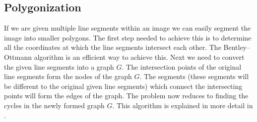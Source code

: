 \documentclass{article}
\begin{document}
\subsection{Polygonization}
If we are given multiple line segments within an image we can easily segment the image into smaller polygons. The first step needed to achieve this is to determine 
all the coordinates at which the line segments intersect each other. The Bentley–Ottmann algorithm is an efficient way to achieve this. Next we need to convert the given line 
segments into a graph $G$. The intersection points of the original line segments form the nodes of the graph $G$. The segments (these segments will be different to the original given line segments)
which connect the intersecting points will form the edges of the graph. The problem now reduces to finding the cycles in the newly formed graph $G$. This algorithm is explained in more detail in \cite{ferreira2003}.

 
\end{document}
